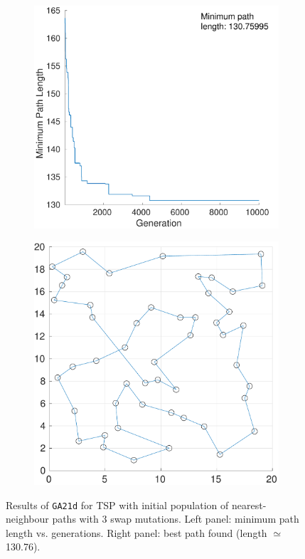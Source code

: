 \documentclass[12pt,titlepage]{article}
\begin{document}
\begin{figure}[htbp]
\centering
\begin{subfigure}{0.475\textwidth}
	\includegraphics[width=\textwidth]{Figures/2d_minpathLength}
	\caption{}
	\label{subfig:2d_minPathLength}
\end{subfigure} %
\hfill %
\begin{subfigure}{0.475\textwidth}
	\includegraphics[width=\textwidth]{Figures/2d_pathPlot}
	\caption{}
	\label{subfig:2d_pathPlot}
\end{subfigure} %
\caption{Results of \texttt{GA21d} for TSP with initial population of nearest-neighbour paths with 3 swap mutations. Left panel: minimum path length vs. generations. Right panel: best path found (length $\simeq$ 130.76).}
\label{fig:1d}
\end{figure}
\end{document}
